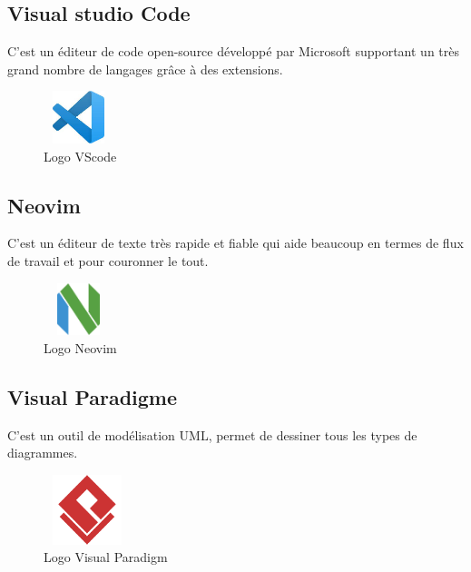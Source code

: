\documentclass[12pt]{report}
\begin{document}
\subsection{Visual studio Code}
\vspace{0.1in}
\hspace*{0.16in}
C’est un éditeur de code open-source développé par Microsoft supportant un très grand nombre de langages grâce à des extensions.

\newpage

\begin{figure}[h]
\centering
    \includegraphics[width = 0.8in, height = 0.6in]{../images/VScode.jpg}
\caption{Logo VScode}
\end{figure}

\subsection{Neovim}
\vspace{0.1in}
\hspace*{0.16in}
C’est un éditeur de texte très rapide et fiable qui aide beaucoup en termes de flux de travail et pour couronner le tout. 

\vspace{0.1in}

\begin{figure}[h]
\centering
    \includegraphics[width = 0.8in, height = 0.6in]{../images/neovim.png}
\caption{Logo Neovim}
\end{figure}

\subsection{Visual Paradigme}
\vspace{0.1in}
\hspace*{0.16in}
C’est un outil de modélisation UML, permet de dessiner tous les types de diagrammes.

\vspace{0.1in}

\begin{figure}[h]
\centering
    \includegraphics[width = 1in, height = 0.8in]{../images/visualParadigm.png}
\caption{Logo Visual Paradigm}
\end{figure}
\end{document}
